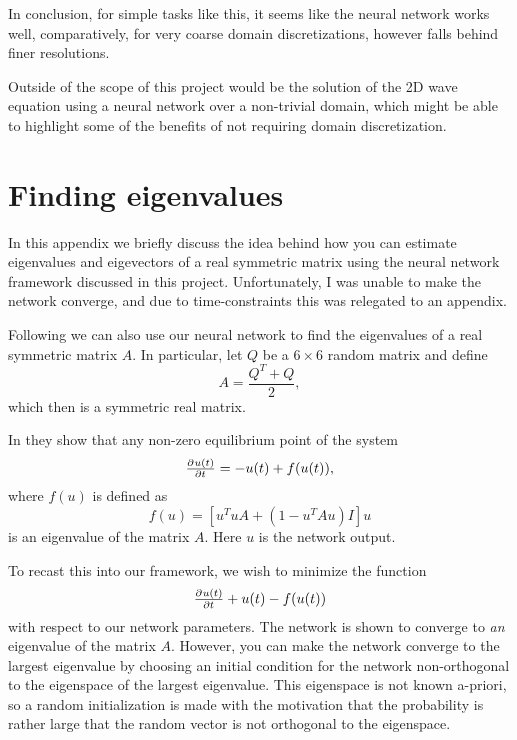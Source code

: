 \documentclass[article, a4paper, oneside]{memoir}
\begin{document}
	In conclusion, for simple tasks like this, it seems like the neural
	network works well, comparatively, for very coarse domain
	discretizations, however falls behind finer resolutions.

	Outside of the scope of this project would be the solution of the 2D
	wave equation using a neural network over a non-trivial domain, which
	might be able to highlight some of the benefits of not requiring domain
	discretization.
\clearpage

\appendix

\chapter{Finding eigenvalues}

In this appendix we briefly discuss the idea behind how you can estimate
eigenvalues and eigevectors of a real symmetric matrix using the neural network
framework discussed in this project. Unfortunately, I was unable to make the
network converge, and due to time-constraints this was relegated to an
appendix.

Following \cite{yiNeuralNetworksBased2004} we can also use our neural network
to find the eigenvalues of a real symmetric matrix \( A \). In particular, let
\( Q \)  be a \( 6 \times 6 \) random matrix and define
\begin{equation}
	A = \frac{Q^T + Q}{2}, 
\end{equation}
which then is a symmetric real matrix.

In \cite{yiNeuralNetworksBased2004} they show that any non-zero equilibrium
point of the system
\begin{equation}
	\pd{u(t)}{t} = -u(t) + f(u(t)), 
\end{equation}
where \( f(u) \) is defined as
\begin{equation}
	f(u) = \left[u^Tu A + \left(1 - u^TAu\right)I\right]u
\end{equation}
is an eigenvalue of the matrix \( A \).
Here \( u \) is the network output.

To recast this into our framework, we wish to minimize the function 
\begin{equation}
	\pd{u(t)}{t} + u(t) - f(u(t))
\end{equation}
with respect to our network parameters. The network is shown to converge to
\emph{an} eigenvalue of the matrix \( A \). However, you can make the network
converge to the largest eigenvalue by choosing an initial condition for the
network non-orthogonal to the eigenspace of the largest eigenvalue. This
eigenspace is not known a-priori, so a random initialization is made with the
motivation that the probability is rather large that the random vector is not
orthogonal to the eigenspace.
\printbibliography
\end{document}
